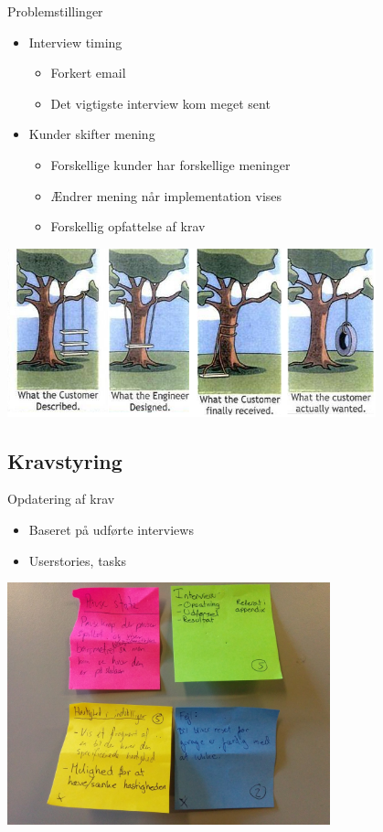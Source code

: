 \begin{frame}{Problemstillinger}
\begin{itemize}
\item Interview timing
\begin{itemize}
\item Forkert email
\item Det vigtigste interview kom meget sent
\end{itemize}
\item Kunder skifter mening
\begin{itemize}
\item Forskellige kunder har forskellige meninger
\item Ændrer mening når implementation vises
\item Forskellig opfattelse af krav
\end{itemize}
\end{itemize}
\begin{center}
\includegraphics[width=0.8\textwidth]{pgraphics/whatthecostumerwanted}
\end{center}
\end{frame}

\subsection{Kravstyring}

\begin{frame}{Opdatering af krav}
\begin{itemize}
\item Baseret på udførte interviews
\item Userstories, tasks
\end{itemize}

\begin{center}
\includegraphics[width = 0.7\textwidth]{pgraphics/tasks}
\end{center}
\end{frame}

